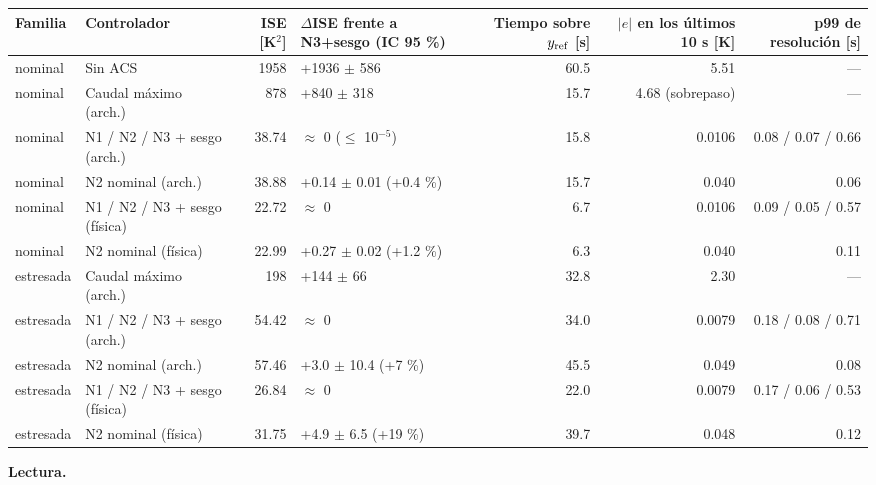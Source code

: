 \documentclass[11pt,a4paper]{article}
\begin{document}
{\footnotesize
\begin{xltabular}{\linewidth}{@{}YYRYRRR@{}}
\toprule
\textbf{Familia} & \textbf{Controlador} & \textbf{ISE [K$^{2}$]} & \textbf{$\Delta$ISE frente a N3+sesgo (IC 95 \%)} & \textbf{Tiempo sobre $y_{\rm ref}$ [s]} & \textbf{$\lvert e\rvert$ en los últimos 10 s [K]} & \textbf{p99 de resolución [s]} \\
\midrule
\endhead
nominal & Sin ACS & 1958 & +1936 $\pm$ 586 & 60.5 & 5.51 & — \\
nominal & Caudal máximo (arch.) & 878 & +840 $\pm$ 318 & 15.7 & 4.68 (sobrepaso) & — \\
nominal & N1 / N2 / N3 + sesgo (arch.) & 38.74 & $\approx$ 0 ($\le$ 10$^{-5}$) & 15.8 & 0.0106 & 0.08 / 0.07 / 0.66 \\
nominal & N2 nominal (arch.) & 38.88 & +0.14 $\pm$ 0.01 (+0.4 \%) & 15.7 & 0.040 & 0.06 \\
nominal & N1 / N2 / N3 + sesgo (física) & 22.72 & $\approx$ 0 & 6.7 & 0.0106 & 0.09 / 0.05 / 0.57 \\
nominal & N2 nominal (física) & 22.99 & +0.27 $\pm$ 0.02 (+1.2 \%) & 6.3 & 0.040 & 0.11 \\
estresada & Caudal máximo (arch.) & 198 & +144 $\pm$ 66 & 32.8 & 2.30 & — \\
estresada & N1 / N2 / N3 + sesgo (arch.) & 54.42 & $\approx$ 0 & 34.0 & 0.0079 & 0.18 / 0.08 / 0.71 \\
estresada & N2 nominal (arch.) & 57.46 & +3.0 $\pm$ 10.4 (+7 \%) & 45.5 & 0.049 & 0.08 \\
estresada & N1 / N2 / N3 + sesgo (física) & 26.84 & $\approx$ 0 & 22.0 & 0.0079 & 0.17 / 0.06 / 0.53 \\
estresada & N2 nominal (física) & 31.75 & +4.9 $\pm$ 6.5 (+19 \%) & 39.7 & 0.048 & 0.12 \\
\bottomrule
\end{xltabular}}

\textbf{Lectura.}
\end{document}
